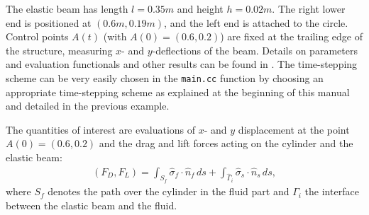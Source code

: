 The elastic beam has length
$l=0.35m$ and height $h=0.02m$. The right lower end is positioned at 
$(0.6m,0.19m)$, and
the left end is attached to the circle. 
Control points $A(t)$ (with $A(0) = (0.6,0.2)$) are fixed at the 
trailing edge of the structure, measuring $x$- and $y$-deflections of the beam.
Details 
on parameters and evaluation functionals and other results 
can be found in \cite{HrTu06b,BuSc06,Wi11}. 
The time-stepping scheme can be 
very easily chosen in the \texttt{main.cc} function by choosing an appropriate 
time-stepping scheme as explained at the beginning of this manual
and detailed in the previous example.

The quantities of interest are evaluations of 
$x$- and $y$ displacement at the point $A(0) = (0.6,0.2)$
and the drag and lift forces acting on the cylinder and the elastic beam:
\begin{align}
\label{drag_lift_forces}
(F_D , F_L) 
= {\int_{S_f} \hat\sigma_f \cdot \hat n_f \, ds + 
\int_{\hat\Gamma_i} \hat\sigma_s \cdot \hat n_s \, ds},
\end{align}
where $S_{f}$ denotes the path over the cylinder in the fluid part and
$\Gamma_i$ the interface between the elastic beam and the 
fluid.

